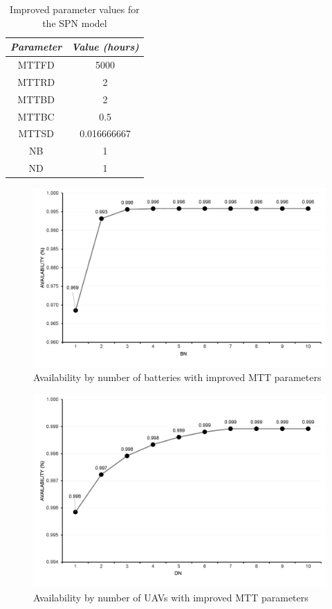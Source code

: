 \documentclass[conference]{IEEEtran}
\begin{document}
\begin{table}[htbp]
\caption{Improved parameter values for the SPN model}
\begin{center}
\begin{tabular}{|c|c|}
\hline
\textbf{\textit{Parameter}} & \textbf{\textit{Value (hours)}} \\
\hline
  MTTFD & 5000\\
 MTTRD & 2\\
 MTTBD & 2 \\ 
 MTTBC & 0.5 \\
 MTTSD & 0.016666667 \\
 NB & 1 \\
 ND & 1 \\
\hline
\end{tabular}
\label{tab:spn_parameter_values}
\end{center}
\end{table}

\begin{figure}[htbp]
\centerline{\includegraphics[scale=0.4]{img/exps/SA_005.png}}
\caption{Availability by number of batteries with improved MTT parameters}
\label{fig:spn_sa_battery}
\end{figure}


\begin{figure}[htbp]
\centerline{\includegraphics[scale=0.4]{img/exps/SA_004.png}}
\caption{Availability by number of UAVs with improved MTT parameters}
\label{fig:spn_sa_uav}
\end{figure}
\end{document}
